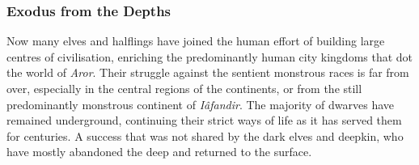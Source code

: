 \subsubsection{Exodus from the Depths}
\label{sec:Exodus from the Depths}

Now many elves and halflings have joined the human effort of building large
centres of civilisation, enriching the predominantly human city kingdoms that
dot the world of \emph{Aror}. Their struggle against the sentient monstrous
races is far from over, especially in the central regions of the continents,
or from the still predominantly monstrous continent of \emph{Iâfandir}. The
majority of dwarves have remained underground, continuing their strict ways of
life as it has served them for centuries. A success that was not shared by the
dark elves and deepkin, who have mostly abandoned the deep and returned to the
surface.












